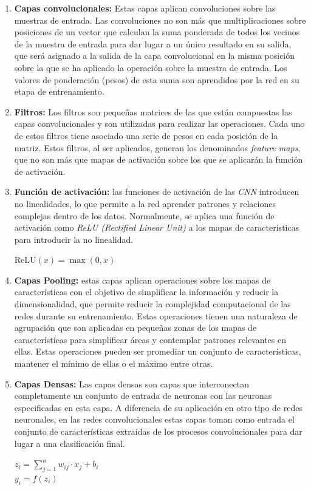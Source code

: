 \begin{enumerate}
	\item \textbf{Capas convolucionales:} Estas capas aplican convoluciones sobre las muestras de entrada. Las convoluciones no son más que multiplicaciones sobre posiciones de un vector que calculan la suma ponderada de todos los vecinos de la muestra de entrada para dar lugar a un único resultado en su salida, que será asignado a la salida de la capa convolucional en la misma posición sobre la que se ha aplicado la operación sobre la muestra de entrada. Los valores de ponderación (pesos) de esta suma son aprendidos por la red en su etapa de entrenamiento.
	
	\item \textbf{Filtros:} Los filtros son pequeñas matrices de las que están compuestas las capas convolucionales y son utilizadas para realizar las operaciones. Cada uno de estos filtros tiene asociado una serie de pesos en cada posición de la matriz. Estos filtros, al ser aplicados, generan los denominados \textit{feature maps}, que no son más que mapas de activación sobre los que se aplicarán la función de activación.
	
	\item \textbf{Función de activación:} las funciones de activación de las \textit{CNN} introducen no linealidades, lo que permite a la red aprender patrones y relaciones complejas dentro de los datos. Normalmente, se aplica una función de activación como \textit{ReLU (Rectified Linear Unit)} a los mapas de características para introducir la no linealidad.
	
	\begin{center}
		$\text{ReLU}(x) = \max(0, x)$
	\end{center}
	
	\item \textbf{Capas Pooling:} estas capas aplican operaciones sobre los mapas de características con el objetivo de simplificar la información y reducir la dimensionalidad, que permite reducir la complejidad computacional de las redes durante su entrenamiento. Estas operaciones tienen una naturaleza de agrupación que son aplicadas en pequeñas zonas de los mapas de características para simplificar áreas y contemplar patrones relevantes en ellas. Estas operaciones pueden ser promediar un conjunto de características, mantener el mínimo de ellas o el máximo entre otras.
	
	\item \textbf{Capas Densas:} Las capas densas son capas que interconectan completamente un conjunto de entrada de neuronas con las neuronas especificadas en esta capa. A diferencia de su aplicación en otro tipo de redes neuronales, en las redes convolucionales estas capas toman como entrada el conjunto de características extraídas de los procesos convolucionales para dar lugar a una clasificación final.
	\begin{center}
		$z_i = \sum_{j=1}^{n} w_{ij} \cdot x_j + b_i$\\
		$y_i = f(z_i)$
	\end{center}
\end{enumerate}


